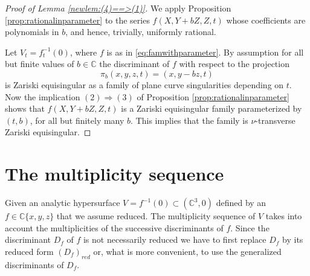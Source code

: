 \documentclass[11pt,a4paper]{amsart}
\newcommand{\1}{{1\!\!1}}
\numberwithin{equation}{section}
\theoremstyle{plain}%
\theoremstyle{definition}
\theoremstyle{definition}
\theoremstyle{remark}
\newcommand{\C}{\mathbb{C}}
\renewcommand{\1}{\mathbf{1}}
\newcommand{\inv}{^{-1}}
\DeclareMathOperator{\idiscr}{ind}
\newcommand{\unt}{$\nu$-transverse }
\newcommand{\multseq}{multiplicity sequence }
\begin{document}
\begin{proof}[Proof of Lemma \ref{newlem:(4)==>(1)}]
We apply Proposition \ref{prop:rationalinparameter} to the series $f(X,Y+bZ, Z, t)$ whose coefficients are polynomials in $b$,  and hence, trivially, uniformly rational.

Let $V_t= f_t\inv (0)$, where $f$ is as in \eqref{eq:famwithparameter}.  
By assumption for all but finite values of $b\in \C $ the discriminant of 
$f$ with respect to the projection 
$$
\pi_b(x,y,z,t) = (x, y-bz,t) 
$$ 
is Zariski equisingular as a family of plane curve singularities depending on $t$. 
Now the implication $(2) \Longrightarrow (3)$ of Proposition \ref{prop:rationalinparameter} shows that 
$f(X,Y+bZ, Z, t)$ is a Zariski equisingular family parameterized by 
$(t,b)$, for all but finitely many $b$.  This implies that the family is   \unt Zariski equisingular.  
\end{proof}







\section{The \multseq }
\label{sec:localinvariant}
 

Given  an analytic hypersurface $V = f^{-1} (0) \subset (\C^3,0)$ defined by an  
$f\in \C \{x,y,z\}$ that we assume reduced.  The \multseq of $V$ takes into account the multiplicities of the successive discriminants of $f$.  
Since the discriminant $D_f$ of $f$ is not necessarily reduced we have to first replace $D_f$ by its reduced form $(D_f)_{red}$ or,  what is more convenient, to use the generalized discriminants of $D_f$.  

\end{document}
